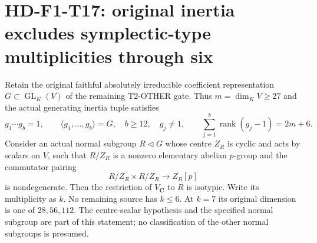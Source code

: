\section[HD-F1-T17: symplectic-type multiplicities at the original source]{HD-F1-T17: original inertia excludes symplectic-type multiplicities through six}
\label{sec:followup-symplectic-multiplicity}

Retain the original faithful absolutely irreducible coefficient
representation $G\subset\operatorname{GL}_K(V)$ of the remaining
T2-OTHER gate. Thus $m=\dim_K V\ge27$ and the actual generating
inertia tuple satisfies
\[
 g_1\cdots g_b=1,\qquad \langle g_1,\ldots,g_b\rangle=G,
 \quad b\ge12,\quad g_j\ne1,\qquad
 \sum_{j=1}^b\operatorname{rank}(g_j-1)=2m+6.
 \tag{F1T17.1}
\]
Consider an actual normal subgroup $R\lhd G$ whose centre $Z_R$
is cyclic and acts by scalars on $V$, such that
$R/Z_R$ is a nonzero elementary abelian $p$-group and the
commutator pairing
\[
 R/Z_R\times R/Z_R\longrightarrow Z_R[p]
 \tag{F1T17.2}
\]
is nondegenerate. Then the restriction of $V_{\mathbf C}$ to
$R$ is isotypic. Write its multiplicity as $k$. No remaining
source has $k\le6$. At $k=7$ its original dimension is one of
$28,56,112$. The centre-scalar hypothesis and the specified normal
subgroup are part of this statement; no classification of the other
normal subgroups is presumed.

